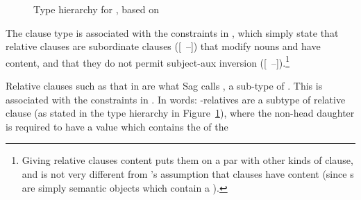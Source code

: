 \documentclass[output=paper
 	        ,biblatex
                ,babelshorthands
                ,newtxmath
                ,draftmode
                ,colorlinks, citecolor=brown
]{langscibook}
\begin{document}
\begin{figure}
  \usebox{\RelcHierarchyDA}
  \caption{Type hierarchy for {\protect{}}, based on }
  \label{fig:rc-42}
\end{figure}
The  clause type is associated with the constraints in , which
simply state that relative clauses are subordinate clauses ([~{--}]) that
modify nouns and have 
content, and that they do not permit
subject-aux inversion ([~{--}]).\footnote{Giving relative clauses
   content puts them on a par with other kinds of clause, and is not
  very different from \citeauthor{Pollard:Sag:94}'s assumption that clauses have
   content (since s are simply semantic objects which contain a ).}
\begin{exe}\ex\label{x:rc-44}
\end{exe}
Relative clauses such as that in  are what Sag calls
, a sub-type of . This is associated with the
constraints in . In words: -relatives are a subtype of relative clause
(as stated in the type hierarchy in Figure~\ref{fig:rc-42}), where the non-head daughter is
required to have a  value which contains the  of the
\end{document}
